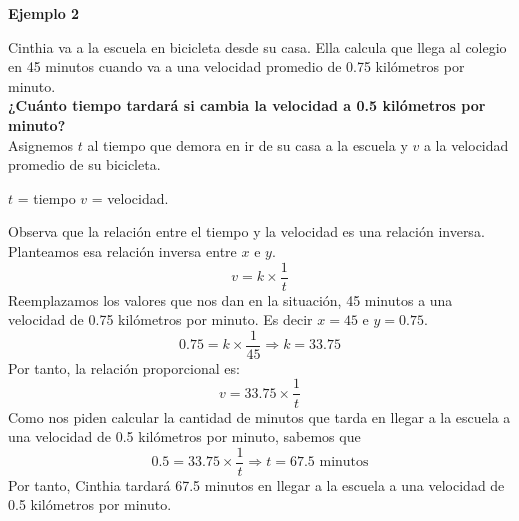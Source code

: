 {\color{brown}\textbf{Ejemplo 2}}

Cinthia va a la escuela en bicicleta desde su casa.
Ella calcula que llega al colegio en 45 minutos cuando va a una velocidad promedio de 0.75 kilómetros por minuto.\\
\textbf{¿Cuánto tiempo tardará si cambia la velocidad a 0.5 kilómetros por minuto?}\\

Asignemos $t$ al tiempo que demora en ir de su casa a la escuela y $v$ a la velocidad promedio de su bicicleta.
\begin{center}
    $t$ = tiempo \quad $v$ = velocidad.
\end{center}
Observa que la relación entre el tiempo y la velocidad es una relación inversa. Planteamos esa relación inversa entre $x$ e $y$.
\[v=k \times \frac{1}{t}\]
Reemplazamos los valores que nos dan en la situación, 45 minutos a una velocidad de 0.75 kilómetros por minuto. Es decir $x=45$ e $y=0.75$.
\[0.75=k\times \frac{1}{45} \Rightarrow k=33.75\]
Por tanto, la relación proporcional es:
\[v=33.75 \times \frac{1}{t}\]
Como nos piden calcular la cantidad de minutos que tarda en llegar a la escuela a una velocidad de 0.5 kilómetros por minuto, sabemos que \[0.5=33.75 \times \frac{1}{t} \Rightarrow t=67.5 \text{ minutos}\]
Por tanto, Cinthia tardará 67.5 minutos en llegar a la escuela a una velocidad de 0.5 kilómetros por minuto.\\
